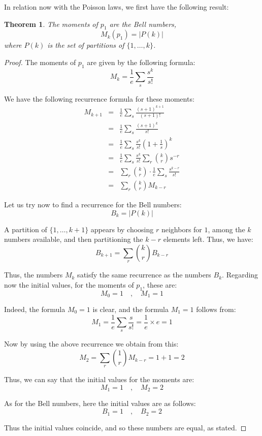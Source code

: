 \documentclass[12pt]{amsbook}
\newtheorem{theorem}{Theorem}[chapter]
\begin{document}
In relation now with the Poisson laws, we first have the following result:


\begin{theorem}
The moments of $p_1$ are the Bell numbers,
$$M_k(p_1)=|P(k)|$$
where $P(k)$ is the set of partitions of $\{1,\ldots,k\}$.
\end{theorem}

\begin{proof}
The moments of $p_1$ are given by the following formula:
$$M_k=\frac{1}{e}\sum_s\frac{s^k}{s!}$$

We have the following recurrence formula for these moments:
\begin{eqnarray*}
M_{k+1}
&=&\frac{1}{e}\sum_s\frac{(s+1)^{k+1}}{(s+1)!}\\
&=&\frac{1}{e}\sum_s\frac{(s+1)^k}{s!}\\
&=&\frac{1}{e}\sum_s\frac{s^k}{s!}\left(1+\frac{1}{s}\right)^k\\
&=&\frac{1}{e}\sum_s\frac{s^k}{s!}\sum_r\binom{k}{r}s^{-r}\\
&=&\sum_r\binom{k}{r}\cdot\frac{1}{e}\sum_s\frac{s^{k-r}}{s!}\\
&=&\sum_r\binom{k}{r}M_{k-r}
\end{eqnarray*}

Let us try now to find a recurrence for the Bell numbers:
$$B_k=|P(k)|$$

A partition of $\{1,\ldots,k+1\}$ appears by choosing $r$ neighbors for $1$, among the $k$ numbers available, and then partitioning the $k-r$ elements left. Thus, we have:
$$B_{k+1}=\sum_r\binom{k}{r}B_{k-r}$$

Thus, the numbers $M_k$ satisfy the same recurrence as the numbers $B_k$. Regarding now the initial values, for the moments of $p_1$, these are:
$$M_0=1\quad,\quad 
M_1=1$$

Indeed, the formula $M_0=1$ is clear, and the formula $M_1=1$ follows from:
$$M_1
=\frac{1}{e}\sum_s\frac{s}{s!}
=\frac{1}{e}\times e
=1$$

Now by using the above recurrence we obtain from this:
$$M_2
=\sum_r\binom{1}{r}M_{k-r}
=1+1
=2$$

Thus, we can say that the initial values for the moments are:
$$M_1=1\quad,\quad 
M_2=2$$

As for the Bell numbers, here the initial values are as follows:
$$B_1=1\quad,\quad 
B_2=2$$

Thus the initial values coincide, and so these numbers are equal, as stated.
\end{proof}
\end{document}
